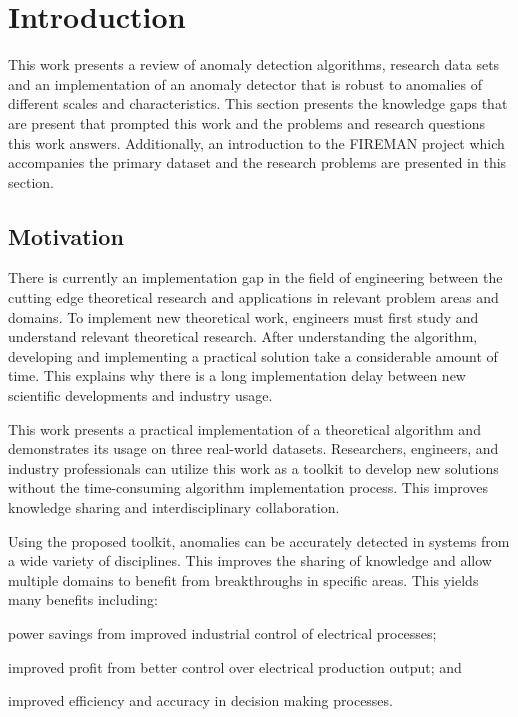 \section{Introduction}
\label{ref_intro}

This work presents a review of anomaly detection algorithms, research data sets and an implementation of an anomaly detector that is robust to anomalies of different scales and characteristics. This section presents the knowledge gaps that are present that prompted this work and the problems and research questions this work answers. Additionally, an introduction to the FIREMAN project which accompanies the primary dataset and the research problems are presented in this section.

\subsection{Motivation}

There is currently an implementation gap in the field of engineering between the cutting edge theoretical research and applications in relevant problem areas and domains. To implement new theoretical work, engineers must first study and understand relevant theoretical research. After understanding the algorithm, developing and implementing a practical solution take a  considerable amount of time. This explains why there is a long implementation delay between new scientific developments and industry usage. 

This work presents a practical implementation of a theoretical algorithm and demonstrates its usage on three real-world datasets. Researchers, engineers, and industry professionals can utilize this work as a toolkit to develop new solutions without the time-consuming algorithm implementation process. This improves knowledge sharing and interdisciplinary collaboration.

Using the proposed toolkit, anomalies can be accurately detected in systems from a wide variety of disciplines. This improves the sharing of knowledge and allow multiple domains to benefit from breakthroughs in specific areas. This yields many benefits including:
\begin{inlinelist}
  \item power savings from improved industrial control of electrical processes;
  \item improved profit from better control over electrical production output; and
  \item improved efficiency and accuracy in decision making processes.
\end{inlinelist}

